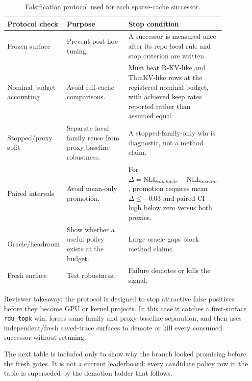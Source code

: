 \documentclass{article}
\begin{document}
\begin{table}[h]
\centering
\small
\begin{tabular}{p{0.23\linewidth}p{0.30\linewidth}p{0.35\linewidth}}
\toprule
Protocol check & Purpose & Stop condition \\
\midrule
Frozen surface & Prevent post-hoc tuning. & A successor is measured once after its repo-local rule and stop criterion are written. \\
Nominal budget accounting & Avoid full-cache comparisons. & Must beat R-KV-like and ThinKV-like rows at the registered nominal budget, with achieved keep rates reported rather than assumed equal. \\
Stopped/proxy split & Separate local family reuse from proxy-baseline robustness. & A stopped-family-only win is diagnostic, not a method claim. \\
Paired intervals & Avoid mean-only promotion. & For $\Delta=\mathrm{NLL}_{candidate}-\mathrm{NLL}_{baseline}$, promotion requires mean $\Delta\leq -0.03$ and paired CI high below zero versus both proxies. \\
Oracle/headroom & Show whether a useful policy exists at the budget. & Large oracle gaps block method claims. \\
Fresh surface & Test robustness. & Failure demotes or kills the signal. \\
\bottomrule
\end{tabular}
\caption{Falsification protocol used for each sparse-cache successor.}
\end{table}

Reviewer takeaway: the protocol is designed to stop attractive false positives
before they become GPU or kernel projects. In this case it catches a
first-surface \texttt{rdu\_topk} win, forces same-family and proxy-baseline
separation, and then uses independent/fresh saved-trace surfaces to demote or
kill every consumed successor without retuning.

The next table is included only to show why the branch looked promising before
the fresh gates. It is not a current leaderboard: every candidate policy row in
the table is superseded by the demotion ladder that follows.
\end{document}
